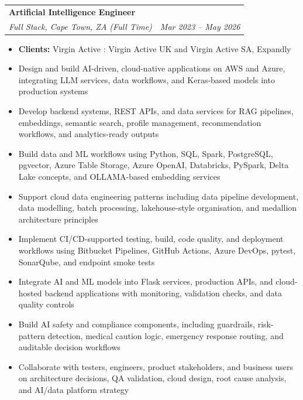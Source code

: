 \documentclass[letterpaper,11pt]{article}
\makeatletter
\newcommand{\resumeItem}[1]{
  \item\small{
    {#1 \vspace{-1pt}}
  }
}
\newcommand{\resumeSubheading}[4]{
  \vspace{-2pt}\item
    \begin{tabular*}{1.0\textwidth}[t]{l@{\extracolsep{\fill}}r}
      \textbf{\large#1} & \textbf{\small #2} \\
      \textit{\large#3} & \textit{\small #4} \\

    \end{tabular*}\vspace{-7pt}
}
\newcommand{\resumeItemListStart}{\begin{itemize}[leftmargin=0.1in]}
\newcommand{\resumeItemListEnd}{\end{itemize}\vspace{-5pt}}
\makeatother
\begin{document}
    \resumeSubheading
      {Artificial Intelligence Engineer}{}
      {Full Stack, Cape Town, ZA (Full Time)}{Mar 2023 -- May 2026}
      \resumeItemListStart
            \resumeItem{\normalsize{\textbf{Clients:} Virgin Active : Virgin Active UK and Virgin Active SA, Expandly}}
            \resumeItem{\normalsize{Design and build AI-driven, cloud-native applications on AWS and Azure, integrating LLM services, data workflows, and Keras-based models into production systems}}
            \resumeItem{\normalsize{Develop backend systems, REST APIs, and data services for RAG pipelines, embeddings, semantic search, profile management, recommendation workflows, and analytics-ready outputs}}
            \resumeItem{\normalsize{Build data and ML workflows using Python, SQL, Spark, PostgreSQL, pgvector, Azure Table Storage, Azure OpenAI, Databricks, PySpark, Delta Lake concepts, and OLLAMA-based embedding services}}
            \resumeItem{\normalsize{Support cloud data engineering patterns including data pipeline development, data modelling, batch processing, lakehouse-style organisation, and medallion architecture principles}}
            \resumeItem{\normalsize{Implement CI/CD-supported testing, build, code quality, and deployment workflows using Bitbucket Pipelines, GitHub Actions, Azure DevOps, pytest, SonarQube, and endpoint smoke tests}}
            \resumeItem{\normalsize{Integrate AI and ML models into Flask services, production APIs, and cloud-hosted backend applications with monitoring, validation checks, and data quality controls}}
            \resumeItem{\normalsize{Build AI safety and compliance components, including guardrails, risk-pattern detection, medical caution logic, emergency response routing, and auditable decision workflows}}
            \resumeItem{\normalsize{Collaborate with testers, engineers, product stakeholders, and business users on architecture decisions, QA validation, cloud design, root cause analysis, and AI/data platform strategy}}
      \resumeItemListEnd
      \vspace{7pt}
\end{document}
